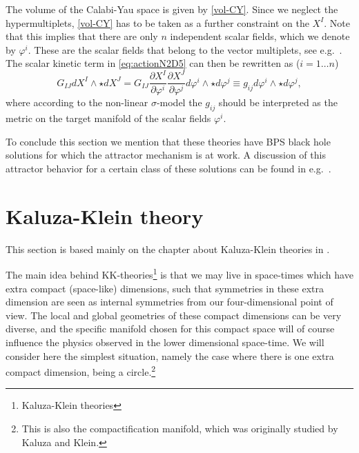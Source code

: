 \documentclass[12pt,twoside]{book}
\begin{document}
The volume of the Calabi-Yau space is given by \eqref{vol-CY}. Since we neglect the hypermultiplets, \eqref{vol-CY} has to be taken as a further constraint on the $X^{I}$. Note that this implies that there are only $n$ independent scalar fields, which we denote by $\varphi^{i}$. These are the scalar fields that belong to the vector multiplets, see e.g.\ \cite{Larsen:2006xm}. The scalar kinetic term in \eqref{eq:actionN2D5} can then be rewritten as ($i = 1 \ldots n$)
\begin{equation}
G_{IJ}dX^{I}\wedge\star dX^{J} = G_{IJ}\frac{\partial X^{I}}{\partial \varphi^{i}} \frac{\partial X^{J}}{\partial \varphi^{j}}
d \varphi^{i}\wedge\star d\varphi^{j} \equiv g_{ij}d \varphi^{i}\wedge\star d\varphi^{j},
\end{equation}
where according to the non-linear $\sigma$-model the $g_{ij}$ should be interpreted as the metric on the target manifold of the scalar fields $\varphi^{i}$.

To conclude this section we mention that these theories have BPS black hole solutions for which the attractor mechanism is at work. A discussion of this attractor behavior for a certain class of these solutions can be found in e.g.\ \cite{Larsen:2006xm}.



\section{Kaluza-Klein theory}

This section is based mainly on the chapter about Kaluza-Klein theories in \cite{Ortin:gravity}.\newline

\noindent
The main idea behind KK-theories\footnote{Kaluza-Klein theories} is that we may live in space-times which have extra compact (space-like) dimensions, such that symmetries in these extra dimension are seen as internal symmetries from our four-dimensional point of view. The local and global geometries of these compact dimensions can be very diverse, and the specific manifold chosen for this compact space will of course influence the physics observed in the lower dimensional space-time. We will consider here the simplest situation, namely the case where there is one extra compact dimension, being a circle.\footnote{
This is also the compactification manifold, which was originally studied by Kaluza and Klein.
}
\end{document}
